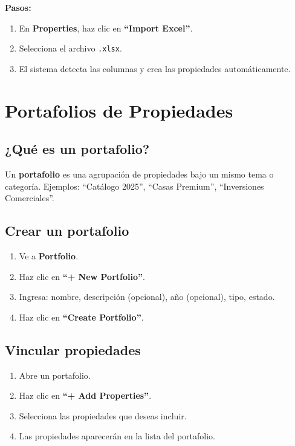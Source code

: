 \documentclass[12pt,oneside]{article}
\begin{document}
\noindent\textbf{Pasos:}
\begin{enumerate}[leftmargin=*]
  \item En \textbf{Properties}, haz clic en \textbf{“Import Excel”}.
  \item Selecciona el archivo \texttt{.xlsx}.
  \item El sistema detecta las columnas y crea las propiedades automáticamente.
\end{enumerate}

\section{Portafolios de Propiedades}

\subsection{¿Qué es un portafolio?}

Un \textbf{portafolio} es una agrupación de propiedades bajo un mismo tema o categoría. Ejemplos: “Catálogo 2025”, “Casas Premium”, “Inversiones Comerciales”.

\subsection{Crear un portafolio}

\begin{enumerate}[leftmargin=*]
  \item Ve a \textbf{Portfolio}.
  \item Haz clic en \textbf{“+ New Portfolio”}.
  \item Ingresa: nombre, descripción (opcional), año (opcional), tipo, estado.
  \item Haz clic en \textbf{“Create Portfolio”}.
\end{enumerate}

\subsection{Vincular propiedades}

\begin{enumerate}[leftmargin=*]
  \item Abre un portafolio.
  \item Haz clic en \textbf{“+ Add Properties”}.
  \item Selecciona las propiedades que deseas incluir.
  \item Las propiedades aparecerán en la lista del portafolio.
\end{enumerate}
\end{document}
